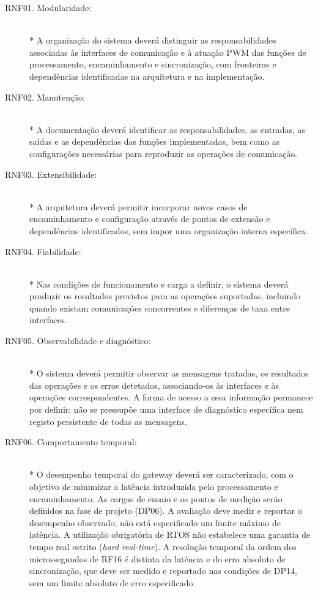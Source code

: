 \begin{description}
    \item[RNF01. Modularidade:] \hfill\\*
    A organização do sistema deverá distinguir as responsabilidades
    associadas às interfaces de comunicação e à atuação PWM das funções
    de processamento, encaminhamento e sincronização, com fronteiras
    e dependências identificadas
    na arquitetura e na implementação.

    \item[RNF02. Manutenção:] \hfill\\*
    A documentação deverá identificar as responsabilidades, as entradas,
    as saídas e as dependências das funções implementadas, bem como as
    configurações necessárias para reproduzir as operações de comunicação.

    \item[RNF03. Extensibilidade:] \hfill\\*
    A arquitetura deverá permitir incorporar novos casos de encaminhamento
    e configuração através de pontos de extensão e dependências
    identificados, sem impor uma organização interna específica.

    \item[RNF04. Fiabilidade:] \hfill\\*
    Nas condições de funcionamento e carga a definir, o sistema deverá
    produzir os resultados previstos para as operações suportadas,
    incluindo quando existam comunicações concorrentes e diferenças
    de taxa entre interfaces.

    \item[RNF05. Observabilidade e diagnóstico:] \hfill\\*
    O sistema deverá permitir observar as mensagens tratadas, os resultados
    das operações e os erros detetados, associando-os às interfaces e às
    operações correspondentes. A forma de acesso a essa informação
    permanece por definir; não se pressupõe uma interface de diagnóstico
    específica nem registo persistente de todas as mensagens.

    \item[RNF06. Comportamento temporal:] \hfill\\*
    O desempenho temporal do gateway deverá ser caracterizado, com o
    objetivo de minimizar a latência introduzida pelo processamento e
    encaminhamento. As cargas de ensaio e os pontos de medição serão
    definidos na fase de projeto (DP06). A avaliação deve medir e reportar
    o desempenho observado; não está especificado um limite máximo de
    latência. A utilização obrigatória de RTOS
    não estabelece uma garantia de tempo real estrito
    (\textit{hard real-time}). A resolução temporal da ordem dos
    microssegundos de RF16 é distinta da latência e do erro absoluto de
    sincronização, que deve ser medido e reportado nas condições de DP14,
    sem um limite absoluto de erro especificado.


\end{description}
